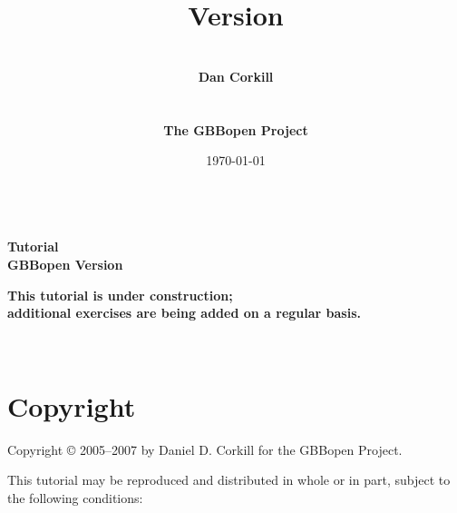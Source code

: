 \documentclass[10pt,twoside,english,pdftex]{article}
\title{\vspace{3in}{\LARGE\textbf{GBBopen Tutorial}}\\[14pt] 
{\Large\textbf{Version \gbbopenversion}}}
\author{\vspace{1in}~\\{\Large\textbf{Dan Corkill}}\\~\\~\\
  {\Large\textbf{The GBBopen Project}}\\[4pt]
  {\large\textbf{\xsitelink{http://GBBopen.org}{http://GBBopen.org}}}}
\date{\today\\[4pt] \hhmm~\timezone}
\newcommand{\inprogress}{\vfill\textcolor{darkergray}{\textsf{\textbf{This
        tutorial is under construction;\\additional exercises are being added
        on a regular basis.}}}}
\begin{document}
\T{}
\T\pagestyle{plain}
\T\thispagestyle{empty}
\T\raggedright
\T\sloppy
\T{}\baselineskip
\T\parindent=0pt
\T\maketitle
\T\renewcommand{\headrulewidth}{0pt}

\T\begin{ifhtml}
{\LARGE\bf Tutorial}\\
{\large\bf GBBopen Version \gbbopenversion}
\T\end{ifhtml}

\begin{center}
\inprogress\\
\end{center}


\T\begin{ifhtml}
  \label{sec:introduction}%
  
  \setcounter{htmlautomenu}{0}
\T\end{ifhtml}

\T\thispagestyle{empty}


\T\newpage
\T~
\T\vfill
\W{}
\W\section*{Copyright}

Copyright \copyright{} 2005--2007 by Daniel D. Corkill for the
GBBopen Project.

This tutorial may be reproduced and distributed in whole or in
part, subject to the following conditions: 
\end{document}
